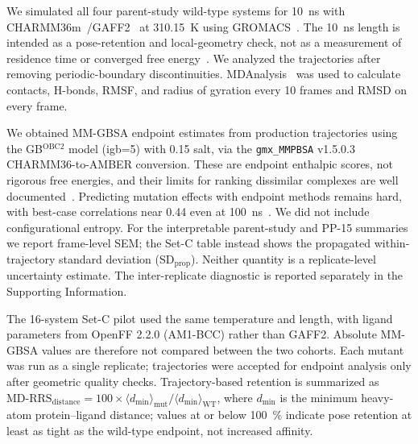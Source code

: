 \documentclass[11pt,a4paper]{article}
\begin{document}
We simulated all four parent-study wild-type systems for \qty{10}{\ns} with CHARMM36m~\citep{charmm36m_2017}/GAFF2~\citep{wang2004gaff} at \qty{310.15}{\kelvin} using GROMACS~\citep{gromacs_2015,lindahl_2024}. The \qty{10}{\ns} length is intended as a pose-retention and local-geometry check, not as a measurement of residence time or converged free energy~\citep{wei2024structure}. We analyzed the trajectories after removing periodic-boundary discontinuities. MDAnalysis~\citep{mdanalysis_2011} was used to calculate contacts, H-bonds, RMSF, and radius of gyration every \num{10} frames and RMSD on every frame.

We obtained MM-GBSA endpoint estimates from production trajectories using the GB$^{\text{OBC2}}$ model (igb=5) with \qty{0.15}{\molar} salt, via the \texttt{gmx\_MMPBSA} v1.5.0.3~\citep{gmx_mmpbsa_2021} CHARMM36-to-AMBER conversion. These are endpoint enthalpic scores, not rigorous free energies, and their limits for ranking dissimilar complexes are well documented~\citep{roux2024mmgbsa}. Predicting mutation effects with endpoint methods remains hard, with best-case correlations near 0.44 even at \qty{100}{\ns}~\citep{yu2022mutation_mmgbsa}. We did not include configurational entropy. For the interpretable parent-study and PP-15 summaries we report frame-level SEM; the Set-C table instead shows the propagated within-trajectory standard deviation (SD$_{\mathrm{prop}}$). Neither quantity is a replicate-level uncertainty estimate. The inter-replicate diagnostic is reported separately in the Supporting Information.

The 16-system Set-C pilot used the same temperature and length, with ligand parameters from OpenFF 2.2.0 (AM1-BCC) rather than GAFF2. Absolute MM-GBSA values are therefore not compared between the two cohorts. Each mutant was run as a single replicate; trajectories were accepted for endpoint analysis only after geometric quality checks. Trajectory-based retention is summarized as $\mathrm{MD\text{-}RRS}_{\mathrm{distance}} = \num{100} \times \langle d_{\min} \rangle_{\mathrm{mut}} / \langle d_{\min} \rangle_{\mathrm{WT}}$, where $d_{\min}$ is the minimum heavy-atom protein--ligand distance; values at or below \qty{100}{\percent} indicate pose retention at least as tight as the wild-type endpoint, not increased affinity.

\end{document}
